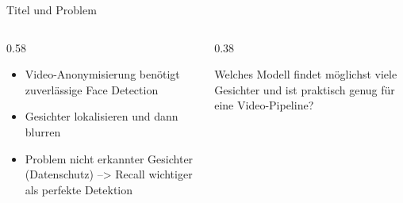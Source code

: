 \begin{frame}{Titel und Problem}
\begin{columns}[T,onlytextwidth]
\begin{column}{0.58\textwidth}
\begin{itemize}
    \item Video-Anonymisierung benötigt zuverlässige Face Detection
    \item Gesichter lokalisieren und dann blurren
    \item Problem nicht erkannter Gesichter (Datenschutz) \newline
   --> Recall wichtiger als perfekte Detektion
\end{itemize}
\end{column}
\begin{column}{0.38\textwidth}
\begin{mynote}[Leitfrage]
Welches Modell findet möglichst viele Gesichter und ist praktisch genug für eine Video-Pipeline?
\end{mynote}
\end{column}
\end{columns}
\end{frame}
